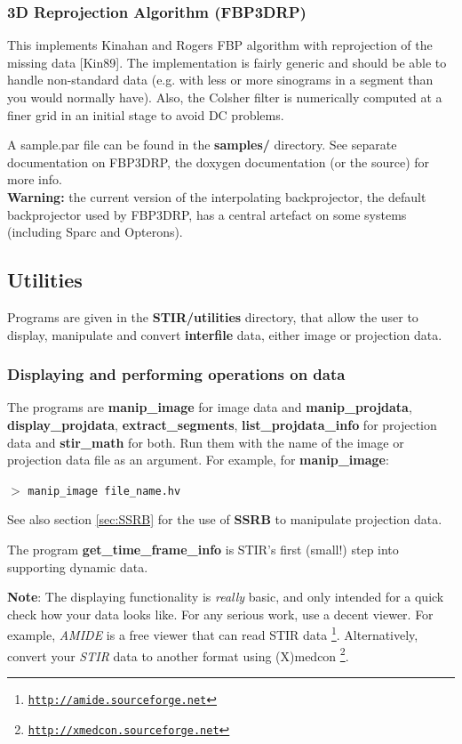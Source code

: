 \documentclass{article}
\def\R2Lurl#1#2{\mbox{\href{#1}{\tt #2}}}
\newcommand{\cmdline}[1]{\par \noindent $>$ \texttt{#1}\par}
\begin{document}
\subsubsection{
3D Reprojection Algorithm (FBP3DRP)}

This implements Kinahan and Rogers FBP algorithm with reprojection 
of the missing data [Kin89]. The implementation is fairly generic 
and should be able to handle non-standard data (e.g. with less 
or more sinograms in a segment than you would normally have). 
Also, the Colsher filter is numerically computed at a finer grid 
in an initial stage to avoid DC problems.


A sample.par file can be found in the \textbf{samples/} 
directory. See separate documentation on FBP3DRP, the doxygen documentation 
(or the source) for more info.\\
\textbf{Warning:} the current version of the interpolating backprojector, 
the default backprojector used by FBP3DRP, has a central artefact 
on some systems (including Sparc and Opterons).


\subsection{
Utilities}

Programs are given in the \textbf{STIR/utilities} directory, that 
allow the user to display, manipulate and convert \textbf{interfile} 
data, either image or projection data.

\subsubsection{
Displaying and performing operations on data}

The programs are \textbf{manip\_image} for image data and \textbf{manip\_projdata}, 
 \textbf{display\_projdata}, \textbf{extract\_segments}, 
\textbf{list\_projdata\_info} for 
projection data and \textbf{stir\_math} for both. Run them with the 
name of the image or projection data file as an argument. For 
example, for \textbf{manip\_image}:
\cmdline{manip\_image file\_name.hv}


See also section \ref{sec:SSRB} for the use of \textbf{SSRB} to manipulate projection 
data.


The program \textbf{get\_time\_frame\_info} is STIR's first (small!) 
step into supporting dynamic data.


\textbf{Note}: The displaying functionality is \textit{really} basic, and 
only intended for a quick check how your data looks like. For 
any serious work, use a decent viewer. For example, \textit{AMIDE} 
is a free viewer that can read STIR data
\footnote{\R2Lurl{http://amide.sourceforge.net }{http://amide.sourceforge.net}}. Alternatively, 
convert your \textit{STIR} data to another format using (X)medcon
\footnote{\R2Lurl{http://xmedcon.sourceforge.net }{http://xmedcon.sourceforge.net}}.
\end{document}
